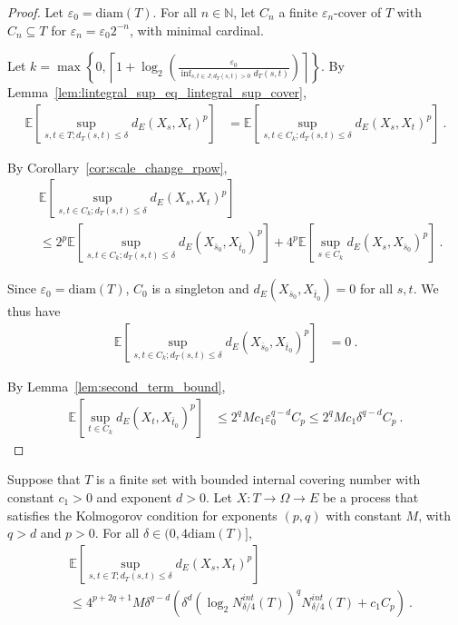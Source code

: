 \begin{proof}
Let $\varepsilon_0 = \mathrm{diam}(T)$.
For all $n \in \mathbb{N}$, let $C_n$ a finite $\varepsilon_n$-cover of $T$ with $C_n \subseteq T$ for $\varepsilon_n = \varepsilon_0 2^{-n}$, with minimal cardinal.

Let $k = \max \left\{ 0, \left\lceil 1 + \log_2\left(\frac{\varepsilon_0}{\inf_{s, t \in J; d_T(s,t)>0}d_T(s, t)}\right) \right\rceil \right\}$.
By Lemma~\ref{lem:lintegral_sup_eq_lintegral_sup_cover},
\begin{align*}
  \mathbb{E}\left[ \sup_{s, t \in T; d_T(s, t) \le \delta} d_E(X_s, X_t)^p \right]
  &= \mathbb{E}\left[ \sup_{s, t \in C_k; d_T(s, t) \le \delta} d_E(X_s, X_t)^p \right]
  \: .
\end{align*}

By Corollary~\ref{cor:scale_change_rpow},
\begin{align*}
  &\mathbb{E}\left[ \sup_{s, t \in C_k; d_T(s, t) \le \delta} d_E(X_s, X_t)^p \right]
  \\
  &\le 2^p \mathbb{E}\left[ \sup_{s, t \in C_k; d_T(s, t) \le \delta} d_E(X_{\bar{s}_0}, X_{\bar{t}_0})^p \right]
    + 4^p \mathbb{E}\left[ \sup_{s \in C_k} d_E(X_s, X_{\bar{s}_0})^p \right]
  \: .
\end{align*}

Since $\varepsilon_0 = \mathrm{diam}(T)$, $C_0$ is a singleton and $d_E(X_{\bar{s}_0}, X_{\bar{t}_0}) = 0$ for all $s, t$.
We thus have
\begin{align*}
  \mathbb{E} \left[ \sup_{s, t \in C_k; d_T(s, t) \le \delta} d_E(X_{\bar{s}_0}, X_{\bar{t}_0})^p \right]
  &= 0
  \: .
\end{align*}

By Lemma~\ref{lem:second_term_bound},
\begin{align*}
  \mathbb{E} \left[\sup_{t \in C_k} d_E(X_t, X_{\bar{t}_0})^p \right]
  &\le 2^q M c_1 \varepsilon_0^{q - d} C_p
  \le 2^q M c_1 \delta^{q - d} C_p
  \: .
\end{align*}
\end{proof}


\begin{theorem}\label{thm:finite_set_bound_of_dist_le_of_le_diam}
  \leanok
Suppose that $T$ is a finite set with bounded internal covering number with constant $c_1>0$ and exponent $d > 0$.
Let $X : T \to \Omega \to E$ be a process that satisfies the Kolmogorov condition for exponents $(p,q)$ with constant $M$, with $q > d$ and $p > 0$.
For all $\delta \in (0, 4\mathrm{diam}(T)]$,
\begin{align*}
  &\mathbb{E}\left[ \sup_{s, t \in T; d_T(s, t) \le \delta} d_E(X_s, X_t)^p \right]
  \\
  &\le 4^{p+2q+1} M \delta^{q-d} \left(\delta^d \left(\log_2 N^{int}_{\delta/4}(T) \right)^q  N^{int}_{\delta/4}(T)
    + c_1 C_p\right)
  \: .
\end{align*}
\end{theorem}


